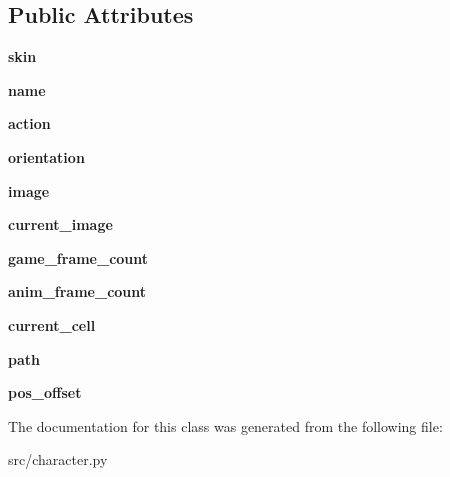 \subsection*{\-Public \-Attributes}
\begin{DoxyCompactItemize}
\item 
\hypertarget{classsrc_1_1character_1_1_character_acdbdc52682490096fe1b8a9f8ebf54f1}{{\bfseries skin}}\label{classsrc_1_1character_1_1_character_acdbdc52682490096fe1b8a9f8ebf54f1}

\item 
\hypertarget{classsrc_1_1character_1_1_character_afb3334beb0b06624fd1b650ab7f3f1f1}{{\bfseries name}}\label{classsrc_1_1character_1_1_character_afb3334beb0b06624fd1b650ab7f3f1f1}

\item 
\hypertarget{classsrc_1_1character_1_1_character_aaeb31304eb0ad214589d94c3891a44a3}{{\bfseries action}}\label{classsrc_1_1character_1_1_character_aaeb31304eb0ad214589d94c3891a44a3}

\item 
\hypertarget{classsrc_1_1character_1_1_character_a67752e1aa8339b60a05f748857a3e924}{{\bfseries orientation}}\label{classsrc_1_1character_1_1_character_a67752e1aa8339b60a05f748857a3e924}

\item 
\hypertarget{classsrc_1_1character_1_1_character_a3b85117f14fcb32a70770aacae99625c}{{\bfseries image}}\label{classsrc_1_1character_1_1_character_a3b85117f14fcb32a70770aacae99625c}

\item 
\hypertarget{classsrc_1_1character_1_1_character_a80a4c4418fcb5064e33c87b029b41c27}{{\bfseries current\-\_\-image}}\label{classsrc_1_1character_1_1_character_a80a4c4418fcb5064e33c87b029b41c27}

\item 
\hypertarget{classsrc_1_1character_1_1_character_a3b5060e03cad9c58aa4f078b74c959ca}{{\bfseries game\-\_\-frame\-\_\-count}}\label{classsrc_1_1character_1_1_character_a3b5060e03cad9c58aa4f078b74c959ca}

\item 
\hypertarget{classsrc_1_1character_1_1_character_a160bae326cb228a24782601120211c53}{{\bfseries anim\-\_\-frame\-\_\-count}}\label{classsrc_1_1character_1_1_character_a160bae326cb228a24782601120211c53}

\item 
\hypertarget{classsrc_1_1character_1_1_character_a77b7b9a3550d60fea43f3b2173afd6fc}{{\bfseries current\-\_\-cell}}\label{classsrc_1_1character_1_1_character_a77b7b9a3550d60fea43f3b2173afd6fc}

\item 
\hypertarget{classsrc_1_1character_1_1_character_a7d90dc4d446c0b810313cfcdaa0d6aa2}{{\bfseries path}}\label{classsrc_1_1character_1_1_character_a7d90dc4d446c0b810313cfcdaa0d6aa2}

\item 
\hypertarget{classsrc_1_1character_1_1_character_a04b220f94b898f65951cc7506c57d212}{{\bfseries pos\-\_\-offset}}\label{classsrc_1_1character_1_1_character_a04b220f94b898f65951cc7506c57d212}

\end{DoxyCompactItemize}


\-The documentation for this class was generated from the following file\-:\begin{DoxyCompactItemize}
\item 
src/character.\-py\end{DoxyCompactItemize}
